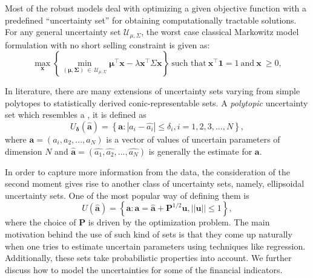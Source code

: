 Most of the robust models deal with optimizing a given objective function with a predefined ``uncertainty set'' for obtaining computationally tractable solutions. For any general uncertainty set $\displaystyle{\mathcal{U}_{\mu,\Sigma}}$, the worst case classical Markowitz model formulation \cite{kim,halldorsson} with no short selling constraint is given as:
\begin{equation}
\label{eq:worst_case_classical_markowitz}
\max\limits_{\mathbf{x}}\left\{\min\limits_{\left(\boldsymbol{\mu},\boldsymbol{\Sigma}\right)~\in~\mathcal{U}_{\mu,\Sigma}}\boldsymbol{\mu}^{\top}\mathbf{x}
-\lambda\mathbf{x^{\top}}\Sigma\mathbf{x}\right\}~\text{such that}~\mathbf{x^{\top}}\mathbf{1}=1~\text{and}~\mathbf{x}~\geq 0,
\end{equation}


In literature, there are many extensions of uncertainty sets varying from simple polytopes to statistically derived conic-representable sets. A \textit{polytopic} \cite{fabozzi} uncertainty set which resembles a , it is defined as
\begin{equation}
\label{eqn:box}
U_{\mathbf{\delta}}(\hat{\mathbf{a}}) = \left\{ \mathbf{a} : | a_i - \hat{a_i}| \leq \delta_i, i = 1,2,3,...,N \right\},
\end{equation}
where $\mathbf{a} = (a_i, a_2, ..., a_N)$ is a vector of values of uncertain parameters of dimension $N$ and $\mathbf{\hat{a}} = (\hat{a_1}, \hat{a_2}, ... , \hat{a_N})$ is generally the estimate for $\mathbf{a}$.

In order to capture more information from the data, the consideration of the second moment gives rise to another class of uncertainty sets, namely, ellipsoidal uncertainty sets. One of the most popular way of defining them \cite{fabozzi} is
\begin{equation}
\label{eqn:ellipse}
U(\hat{\mathbf{a}}) = \left\{ \mathbf{a} : \mathbf{a} = \hat{\mathbf{a}} + \mathbf{P}^{1/2}\mathbf{u}, ||\mathbf{u}||\leq 1 \right\},
\end{equation}
where the choice of $\mathbf{P}$ is driven by the optimization problem. The main motivation behind the use of such kind of sets is that they come up naturally when one tries to estimate uncertain parameters using techniques like regression. Additionally, these sets take probabilistic properties into account. We further discuss how to model the uncertainties for some of the financial indicators.

